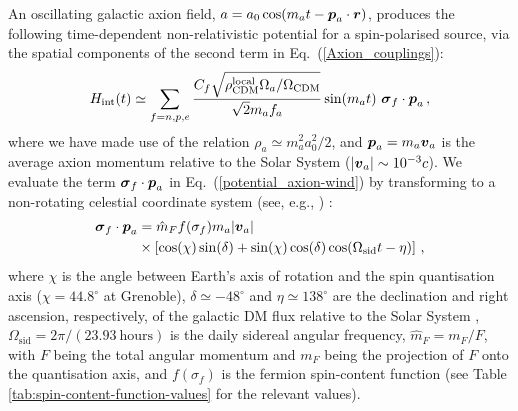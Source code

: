 An oscillating galactic axion field, $a = a_0 \cos(m_a t - \boldsymbol{p}_a \cdot \boldsymbol{r})$, produces the following time-dependent non-relativistic potential for a spin-polarised source, via the spatial components of the second term in Eq.~(\ref{Axion_couplings}):
\begin{equation}
\label{potential_axion-wind}
H_{\textrm{int}} (t) \simeq \sum_{f=n,p,e} \frac{C_f \sqrt{\rho_{\textrm{CDM}}^{\textrm{local}} \Omega_a / \Omega_{\textrm{CDM}}}}{\sqrt{2} m_a f_a} \sin(m_a t) ~ \boldsymbol{\sigma}_f \cdot \boldsymbol{p}_a \, ,
\end{equation}
where we have made use of the relation $\rho_a \simeq m_a^2 a_0^2 /2$, and $\boldsymbol{p}_a = m_a \boldsymbol{v}_a$ is the average axion momentum relative to the Solar System ($|\boldsymbol{v}_a| \sim 10^{-3} c$).
We evaluate the term $\boldsymbol{\sigma}_f \cdot \boldsymbol{p}_a$ in Eq.~(\ref{potential_axion-wind}) by transforming to a non-rotating celestial coordinate system (see, e.g., \cite{Kostelecky1999}) :
\begin{align}
\label{sigma-p_a_2}
\boldsymbol{\sigma}_f \cdot \boldsymbol{p}_a & = \hat{m}_F f(\sigma_f) m_a |\boldsymbol{v}_a|  \notag \\
&\times \left[\cos(\chi) \sin(\delta) + \sin(\chi) \cos(\delta) \cos(\Omega_{\textrm{sid}} t - \eta) \right] \, ,
\end{align}
where $\chi$ is the angle between Earth's axis of rotation and the spin quantisation axis ($\chi = 44.8^\circ$ at Grenoble), $\delta \simeq -48 ^\circ$ and $\eta \simeq 138 ^\circ$ are the declination and right ascension, respectively, of the galactic DM flux relative to the Solar System \cite{NASA2014web}, $\Omega_{\textrm{sid}} = 2\pi / (23.93~\textrm{hours})$ is the daily sidereal angular frequency, $\hat{m}_F = m_F / F$, with $F$ being the total angular momentum and $m_F$ being the projection of $F$ onto the quantisation axis, and $f(\sigma_f)$ is the fermion spin-content function (see Table \ref{tab:spin-content-function-values} for the relevant values).


